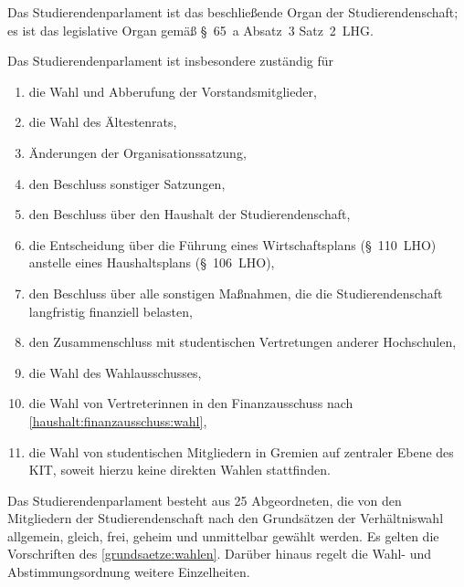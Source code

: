 Das Studierendenparlament ist das beschließende Organ der Studierendenschaft; es ist das legislative Organ gemäß §~65~a Absatz~3 Satz~2~LHG.

Das Studierendenparlament ist insbesondere zuständig für
\begin{enumerate}
\item die Wahl und Abberufung der Vorstandsmitglieder,
\item die Wahl des Ältestenrats,
\item Änderungen der Organisationssatzung,
\item den Beschluss sonstiger Satzungen,
\item den Beschluss über den Haushalt der Studierendenschaft,
\item die Entscheidung über die Führung eines Wirtschaftsplans (§~110~LHO) anstelle eines Haushaltsplans (§~106~LHO),
\item den Beschluss über alle sonstigen Maßnahmen, die die Studierendenschaft langfristig finanziell belasten,
\item den Zusammenschluss mit studentischen Vertretungen anderer Hochschulen,
\item die Wahl des Wahlausschusses,
\item die Wahl von Vertreterinnen in den Finanzausschuss nach \ref{haushalt:finanzausschuss:wahl},
\item die Wahl von studentischen Mitgliedern in Gremien auf zentraler Ebene des KIT, soweit hierzu keine direkten Wahlen stattfinden.
\end{enumerate}


\label{stupa:zusammensetzung}

Das Studierendenparlament besteht aus 25 Abgeordneten, die von den Mitgliedern der Studierendenschaft nach den Grundsätzen der Verhältniswahl allgemein, gleich, frei, geheim und unmittelbar gewählt werden. Es gelten die Vorschriften des \ref{grundsaetze:wahlen}. Darüber hinaus regelt die Wahl- und Abstimmungsordnung weitere Einzelheiten.

